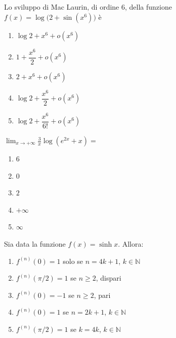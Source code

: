 \begin{quiz}
Lo sviluppo di Mac Laurin, di ordine $6$, della funzione $f(x)=\log\bigl(2+\sin(x^6)\bigr)$ \`e
\begin{enumerate}
\item $\log2+x^6+o(x^6)$
\item $1+\dfrac{x^6}{2}+o(x^6)$
\item $2+x^6+o(x^6)$
\item $\log2+\dfrac{x^6}{2}+o(x^6)$
\item $\log2+\dfrac{x^6}{6!}+o(x^6)$
\end{enumerate}
\end{quiz}

\begin{quiz}
$\displaystyle\lim_{x\to+\infty}\frac3x\log(e^{2x}+x)=$
\begin{enumerate}
\item $6$
\item $0$
\item $2$
\item $+\infty$
\item $\infty$
\end{enumerate}
\end{quiz}

\begin{quiz}
Sia data la funzione $f(x)=\sinh x$. Allora:
\begin{enumerate}
\item $f^{(n)}(0)=1$ solo se $n=4k+1$, $k\in\mathbb N$
\item $f^{(n)}(\pi/2)=1$ se $n\ge2$, dispari
\item $f^{(n)}(0)=-1$ se $n\ge2$, pari
\item $f^{(n)}(0)=1$ se $n=2k+1$, $k\in\mathbb N$
\item $f^{(n)}(\pi/2)=1$ se $k=4k$, $k\in\mathbb N$
\end{enumerate}
\end{quiz}

